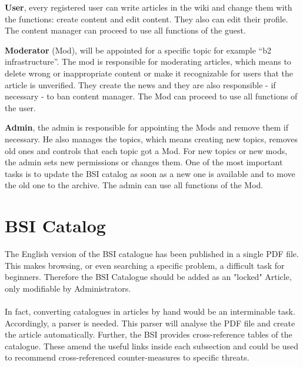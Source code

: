 \textbf{User}, every registered user can write articles in the wiki and change them with the functions: create content and edit content. They also can edit their profile. The content manager can proceed to use all functions of the guest.

\textbf{Moderator} (Mod), will be appointed for a specific topic for example “b2 infrastructure”. The mod is responsible for moderating articles, which means to delete wrong or inappropriate content or make it recognizable for users that the article is unverified. They create the news and they are also responsible - if necessary - to ban content manager. The Mod can proceed to use all functions of the user.

\textbf{Admin}, the admin is responsible for appointing the Mods and remove them if necessary. He also manages the topics, which means creating new topics, removes old ones and controls that each topic got a Mod. For new topics or new mods, the admin sets new permissions or changes them. One of the most important tasks is to update the BSI catalog as soon as a new one is available and to move the old one to the archive. The admin can use all functions of the Mod.
\section{BSI Catalog}
The English version of the BSI catalogue has been published in a single PDF file. This makes browsing, or even searching a specific problem, a difficult task for beginners. Therefore the BSI Catalogue should be added as an "locked" Article, only modifiable by Administrators.
\\\\
In fact, converting catalogues in articles by hand would be an interminable task. Accordingly, a parser is needed. This parser will analyse the PDF file and create the article automatically. Further, the BSI provides cross-reference tables of the catalogue. These amend the useful links inside each subsection and could be used to recommend cross-referenced counter-measures to specific threats.


